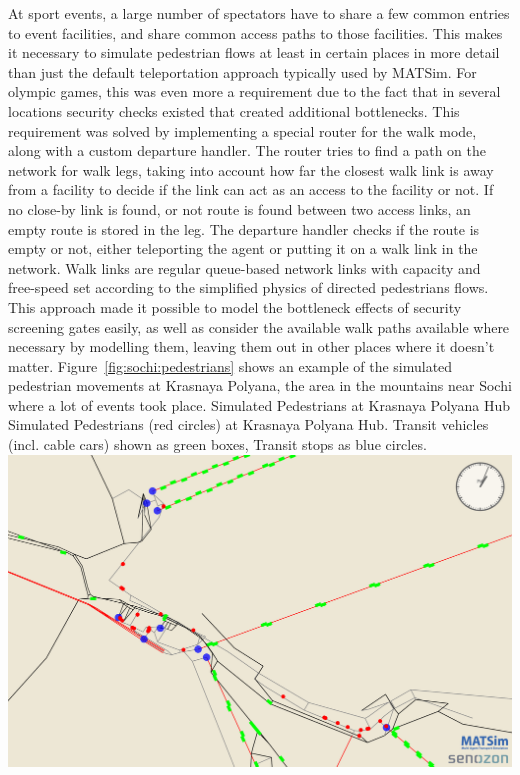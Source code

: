 At sport events, a large number of spectators have to share a few common entries
to event facilities, and share common access paths to those facilities. This
makes it necessary to simulate pedestrian flows at least in certain places in
more detail than just the default teleportation approach typically used by
MATSim. For olympic games, this was even more a requirement due to the fact
that in several locations security checks existed that created additional
bottlenecks. This requirement was solved by implementing a special router for
the walk mode, along with a custom departure handler. The router tries to find a
path on the network for walk legs, taking into account how far the closest walk
link is away from a facility to decide if the link can act as an access to the
facility or not. If no close-by link is found, or not route is found between
two access links, an empty route is stored in the leg. The departure handler
checks if the route is empty or not, either teleporting the agent or putting it
on a walk link in the network. Walk links are regular queue-based network links
with capacity and free-speed set according to the simplified physics of
directed pedestrians flows. This approach made it possible to model the
bottleneck effects of security screening gates easily, as well as consider the
available walk paths available where necessary by modelling them, leaving them
out in other places where it doesn't matter. Figure~\ref{fig:sochi:pedestrians}
shows an example of the simulated pedestrian movements at Krasnaya Polyana, the
area in the mountains near Sochi where a lot of events took place.  
%
\createfigure%
{Simulated Pedestrians at Krasnaya Polyana Hub}%
{Simulated Pedestrians (red circles) at Krasnaya Polyana Hub. Transit vehicles
(incl. cable cars) shown as green boxes, Transit stops as blue circles.}%
{\label{fig:sochi:pedestrians}}%
{\includegraphics[width=1.\textwidth,angle=0]{./using/figures/sochi_pedestrians.pdf}}%
{}
%

